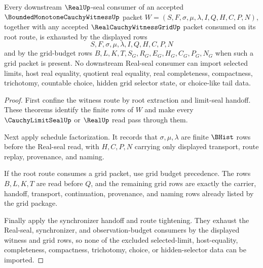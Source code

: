 \begin{theorem}
\label{thm:bounded-monotone-cauchy-witness-real-seal-consumer-exhaustion}
Every downstream $\RealUp$-seal consumer of an accepted $\BoundedMonotoneCauchyWitnessUp$ packet $W=(S,F,\sigma,\mu,\lambda,I,Q,H,C,P,N)$, together with any accepted $\RealCauchyWitnessGridUp$ packet consumed on its root route, is exhausted by the displayed rows
$$
S,F,\sigma,\mu,\lambda,I,Q,H,C,P,N
$$
and by the grid-budget rows $B,L,K,T,S_G,R_G,E_G,H_G,C_G,P_G,N_G$ when such a grid packet is present. No downstream Real-seal consumer can import selected limits, host real equality, quotient real equality, real completeness, compactness, trichotomy, countable choice, hidden grid selector state, or choice-like tail data.
\end{theorem}
\begin{proof}
First confine the witness route by root extraction and limit-seal handoff. These theorems identify the finite rows of $W$ and make every $\CauchyLimitSealUp$ or $\RealUp$ read pass through them.

Next apply schedule factorization. It records that $\sigma,\mu,\lambda$ are finite $\BHist$ rows before the Real-seal read, with $H,C,P,N$ carrying only displayed transport, route replay, provenance, and naming.

If the root route consumes a grid packet, use grid budget precedence. The rows $B,L,K,T$ are read before $Q$, and the remaining grid rows are exactly the carrier, handoff, transport, continuation, provenance, and naming rows already listed by the grid package.

Finally apply the synchronizer handoff and route tightening. They exhaust the Real-seal, synchronizer, and observation-budget consumers by the displayed witness and grid rows, so none of the excluded selected-limit, host-equality, completeness, compactness, trichotomy, choice, or hidden-selector data can be imported.
\end{proof}

